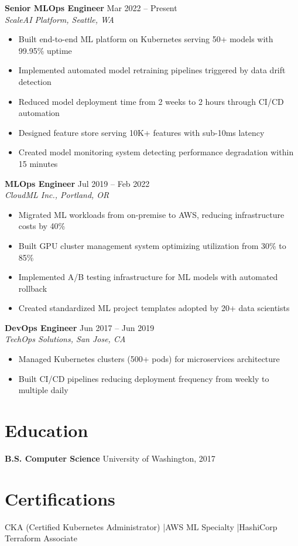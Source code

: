 \documentclass[11pt,a4paper]{article}
\begin{document}
\noindent\textbf{Senior MLOps Engineer} \hfill \textcolor{accent}{Mar 2022 -- Present}\\
\textit{ScaleAI Platform, Seattle, WA}
\begin{itemize}[leftmargin=1.2em,nosep,label={\color{accent}$\triangleright$}]
\item Built end-to-end ML platform on Kubernetes serving 50+ models with 99.95\% uptime
\item Implemented automated model retraining pipelines triggered by data drift detection
\item Reduced model deployment time from 2 weeks to 2 hours through CI/CD automation
\item Designed feature store serving 10K+ features with sub-10ms latency
\item Created model monitoring system detecting performance degradation within 15 minutes
\end{itemize}
\vspace{0.5em}

\noindent\textbf{MLOps Engineer} \hfill \textcolor{accent}{Jul 2019 -- Feb 2022}\\
\textit{CloudML Inc., Portland, OR}
\begin{itemize}[leftmargin=1.2em,nosep,label={\color{accent}$\triangleright$}]
\item Migrated ML workloads from on-premise to AWS, reducing infrastructure costs by 40\%
\item Built GPU cluster management system optimizing utilization from 30\% to 85\%
\item Implemented A/B testing infrastructure for ML models with automated rollback
\item Created standardized ML project templates adopted by 20+ data scientists
\end{itemize}
\vspace{0.5em}

\noindent\textbf{DevOps Engineer} \hfill \textcolor{accent}{Jun 2017 -- Jun 2019}\\
\textit{TechOps Solutions, San Jose, CA}
\begin{itemize}[leftmargin=1.2em,nosep,label={\color{accent}$\triangleright$}]
\item Managed Kubernetes clusters (500+ pods) for microservices architecture
\item Built CI/CD pipelines reducing deployment frequency from weekly to multiple daily
\end{itemize}

\section{Education}
\noindent\textbf{B.S. Computer Science} \hfill University of Washington, 2017

\section{Certifications}
\noindent CKA (Certified Kubernetes Administrator) \quad\textcolor{accent}{|}\quad AWS ML Specialty \quad\textcolor{accent}{|}\quad HashiCorp Terraform Associate
\end{document}
